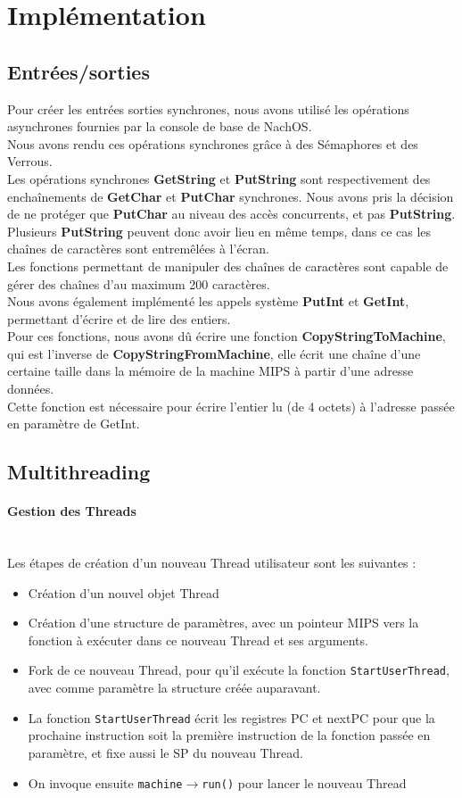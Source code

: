 \documentclass{report}
\newcommand{\myparagraph}[1]{\paragraph*{#1}\mbox{}\\}
\begin{document}
\section*{Implémentation}
\subsection*{Entrées/sorties}

Pour créer les entrées sorties synchrones, nous avons utilisé les opérations asynchrones fournies par la console de base de NachOS.\\
Nous avons rendu ces opérations synchrones grâce à des Sémaphores et des Verrous.\\
Les opérations synchrones \textbf{GetString} et \textbf{PutString} sont respectivement des enchaînements de \textbf{GetChar} et \textbf{PutChar} synchrones.
Nous avons pris la décision de ne protéger que \textbf{PutChar} au niveau des accès concurrents, et pas \textbf{PutString}. Plusieurs \textbf{PutString} peuvent donc avoir lieu en même temps, dans ce cas les chaînes de caractères sont entremêlées à l'écran.\\
Les fonctions permettant de manipuler des chaînes de caractères sont capable de gérer des chaînes d'au maximum 200 caractères.\\

Nous avons également implémenté les appels système \textbf{PutInt} et \textbf{GetInt}, permettant d'écrire et de lire des entiers.\\
Pour ces fonctions, nous avons dû écrire une fonction \textbf{CopyStringToMachine}, qui est l'inverse de \textbf{CopyStringFromMachine}, elle écrit une chaîne d'une certaine taille dans la mémoire de la machine MIPS à partir d'une adresse données.\\
Cette fonction est nécessaire pour écrire l'entier lu (de 4 octets) à l'adresse passée en paramètre de GetInt.
\subsection*{Multithreading}
\myparagraph{Gestion des Threads}

\noindent
Les étapes de création d'un nouveau Thread utilisateur sont les suivantes : 
\begin{itemize}
	\item Création d'un nouvel objet Thread
	\item Création d'une structure de paramètres, avec un pointeur MIPS vers la fonction à exécuter dans ce nouveau Thread et ses arguments.
	\item Fork de ce nouveau Thread, pour qu'il exécute la fonction \texttt{StartUserThread}, avec comme paramètre la structure créée auparavant.
	\item La fonction \texttt{StartUserThread} écrit les registres PC et nextPC pour que la prochaine instruction soit la première instruction de la fonction passée en paramètre, et fixe aussi le SP du nouveau Thread.
	\item On invoque ensuite \texttt{machine$\rightarrow$run()} pour lancer le nouveau Thread
\end{itemize}
\end{document}
